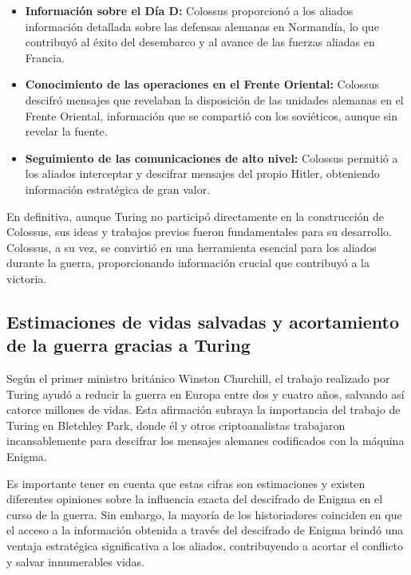 \documentclass{article}
\begin{document}
\begin{itemize}
    \item \textbf{Información sobre el Día D:} Colossus 
    proporcionó a los aliados 
    información detallada sobre las defensas alemanas en 
    Normandía, lo que contribuyó 
    al éxito del desembarco y al avance de las fuerzas 
    aliadas en Francia.\cite{ColossusO}
    
    \item \textbf{Conocimiento de las operaciones en el Frente Oriental:} Colossus descifró 
    mensajes que revelaban la disposición de las unidades 
    alemanas en el Frente Oriental, 
    información que se compartió con los soviéticos, aunque 
    sin revelar la fuente.\cite{ColossusO}
    
    \item \textbf{Seguimiento de las comunicaciones de alto nivel:} Colossus permitió a los 
    aliados interceptar y descifrar mensajes del propio
    Hitler, obteniendo información estratégica de gran 
    valor.\cite{ColossusO}
\end{itemize}


En definitiva, aunque Turing no participó 
directamente en la construcción de Colossus, 
sus ideas y trabajos previos fueron fundamentales 
para su desarrollo. Colossus, a su vez, se 
convirtió en una herramienta esencial para los 
aliados durante la guerra, proporcionando 
información crucial que contribuyó a la victoria.

\subsection{Estimaciones de vidas salvadas y acortamiento de la guerra gracias a Turing}

Según el primer ministro británico Winston Churchill, 
el trabajo realizado por Turing ayudó a reducir la 
guerra en Europa entre dos y cuatro años, salvando 
así catorce millones de vidas. Esta afirmación 
subraya la importancia del trabajo de Turing en 
Bletchley Park, donde él y otros criptoanalistas 
trabajaron incansablemente para descifrar los 
mensajes alemanes codificados con la máquina Enigma.\cite{AlanTuringEnigmaO}

Es importante tener en cuenta que estas cifras 
son estimaciones y existen diferentes opiniones 
sobre la influencia exacta del descifrado de 
Enigma en el curso de la guerra. Sin embargo, 
la mayoría de los historiadores coinciden en 
que el acceso a la información obtenida a través 
del descifrado de Enigma brindó una ventaja 
estratégica significativa a los aliados, 
contribuyendo a acortar el conflicto y salvar 
innumerables vidas.
\end{document}
